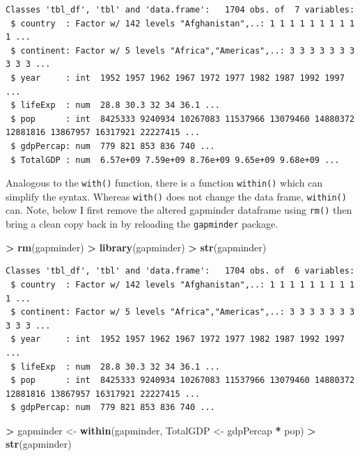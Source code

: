 \documentclass[]{krantz}
\makeatletter
\newenvironment{Shaded}{\begin{snugshade}}{\end{snugshade}}
\newcommand{\KeywordTok}[1]{\textcolor[rgb]{0.27,0.27,0.27}{\textbf{#1}}}
\newcommand{\StringTok}[1]{\textcolor[rgb]{0.5,0.5,0.5}{#1}}
\newcommand{\OperatorTok}[1]{\textcolor[rgb]{0.43,0.43,0.43}{\textbf{#1}}}
\newcommand{\NormalTok}[1]{#1}
\newenvironment{kframe}{%
\medskip{}
\setlength{\fboxsep}{.8em}
 \def\at@end@of@kframe{}%
 \ifinner\ifhmode%
  \def\at@end@of@kframe{\end{minipage}}%
  \begin{minipage}{\columnwidth}%
 \fi\fi%
 \def\FrameCommand##1{\hskip\@totalleftmargin \hskip-\fboxsep
 \colorbox{shadecolor}{##1}\hskip-\fboxsep
     \hskip-\linewidth \hskip-\@totalleftmargin \hskip\columnwidth}%
 \MakeFramed {\advance\hsize-\width
   \@totalleftmargin\z@ \linewidth\hsize
   \@setminipage}}%
 {\par\unskip\endMakeFramed%
 \at@end@of@kframe}
\renewenvironment{Shaded}{\begin{kframe}}{\end{kframe}}
\makeatother
\begin{document}
\begin{verbatim}
Classes 'tbl_df', 'tbl' and 'data.frame':   1704 obs. of  7 variables:
 $ country  : Factor w/ 142 levels "Afghanistan",..: 1 1 1 1 1 1 1 1 1 1 ...
 $ continent: Factor w/ 5 levels "Africa","Americas",..: 3 3 3 3 3 3 3 3 3 3 ...
 $ year     : int  1952 1957 1962 1967 1972 1977 1982 1987 1992 1997 ...
 $ lifeExp  : num  28.8 30.3 32 34 36.1 ...
 $ pop      : int  8425333 9240934 10267083 11537966 13079460 14880372 12881816 13867957 16317921 22227415 ...
 $ gdpPercap: num  779 821 853 836 740 ...
 $ TotalGDP : num  6.57e+09 7.59e+09 8.76e+09 9.65e+09 9.68e+09 ...
\end{verbatim}

Analogous to the \texttt{with()} function, there is a function
\texttt{within()} which can simplify the syntax. Whereas \texttt{with()}
does not change the data frame, \texttt{within()} can. Note, below I
first remove the altered gapminder dataframe using \texttt{rm()} then
bring a clean copy back in by reloading the \texttt{gapminder} package.

\begin{Shaded}
\begin{Highlighting}[]
\OperatorTok{>}\StringTok{ }\KeywordTok{rm}\NormalTok{(gapminder)}
\OperatorTok{>}\StringTok{ }\KeywordTok{library}\NormalTok{(gapminder)}
\OperatorTok{>}\StringTok{ }\KeywordTok{str}\NormalTok{(gapminder)}
\end{Highlighting}
\end{Shaded}

\begin{verbatim}
Classes 'tbl_df', 'tbl' and 'data.frame':   1704 obs. of  6 variables:
 $ country  : Factor w/ 142 levels "Afghanistan",..: 1 1 1 1 1 1 1 1 1 1 ...
 $ continent: Factor w/ 5 levels "Africa","Americas",..: 3 3 3 3 3 3 3 3 3 3 ...
 $ year     : int  1952 1957 1962 1967 1972 1977 1982 1987 1992 1997 ...
 $ lifeExp  : num  28.8 30.3 32 34 36.1 ...
 $ pop      : int  8425333 9240934 10267083 11537966 13079460 14880372 12881816 13867957 16317921 22227415 ...
 $ gdpPercap: num  779 821 853 836 740 ...
\end{verbatim}

\begin{Shaded}
\begin{Highlighting}[]
\OperatorTok{>}\StringTok{ }\NormalTok{gapminder <-}\StringTok{ }\KeywordTok{within}\NormalTok{(gapminder, TotalGDP <-}\StringTok{ }\NormalTok{gdpPercap }\OperatorTok{*}\StringTok{ }\NormalTok{pop)}
\OperatorTok{>}\StringTok{ }\KeywordTok{str}\NormalTok{(gapminder)}
\end{Highlighting}
\end{Shaded}
\end{document}
